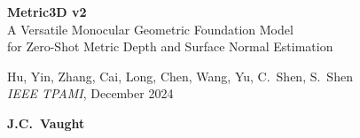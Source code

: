 \begin{frame}
\vspace{1.2cm}
\centering
{\huge\textcolor{garnet}{\textbf{Metric3D v2}}}\\[6pt]
{\normalsize A Versatile Monocular Geometric Foundation Model\\
for Zero-Shot Metric Depth and Surface Normal Estimation}

\vspace{0.6cm}
{\small Hu, Yin, Zhang, Cai, Long, Chen, Wang, Yu, C.\ Shen, S.\ Shen\\[2pt]
\textit{IEEE TPAMI}, December 2024}

\vspace{0.8cm}
{\LARGE\textbf{J.C.\ Vaught}}
\end{frame}
